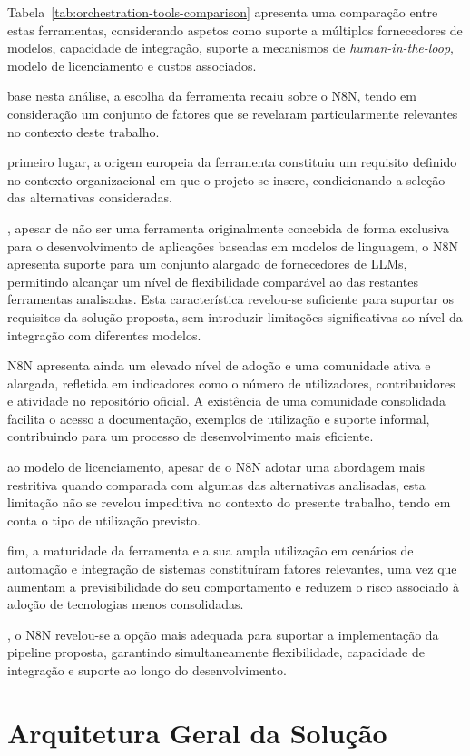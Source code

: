  Tabela~\ref{tab:orchestration-tools-comparison} apresenta uma comparação entre estas ferramentas, considerando aspetos como suporte a múltiplos fornecedores de modelos, capacidade de integração, suporte a mecanismos de \textit{human-in-the-loop}, modelo de licenciamento e custos associados.

 base nesta análise, a escolha da ferramenta recaiu sobre o N8N, tendo em consideração um conjunto de fatores que se revelaram particularmente relevantes no contexto deste trabalho.

 primeiro lugar, a origem europeia da ferramenta constituiu um requisito definido no contexto organizacional em que o projeto se insere, condicionando a seleção das alternativas consideradas.

, apesar de não ser uma ferramenta originalmente concebida de forma exclusiva para o desenvolvimento de aplicações baseadas em modelos de linguagem, o N8N apresenta suporte para um conjunto alargado de fornecedores de LLMs, permitindo alcançar um nível de flexibilidade comparável ao das restantes ferramentas analisadas. Esta característica revelou-se suficiente para suportar os requisitos da solução proposta, sem introduzir limitações significativas ao nível da integração com diferentes modelos.

 N8N apresenta ainda um elevado nível de adoção e uma comunidade ativa e alargada, refletida em indicadores como o número de utilizadores, contribuidores e atividade no repositório oficial. A existência de uma comunidade consolidada facilita o acesso a documentação, exemplos de utilização e suporte informal, contribuindo para um processo de desenvolvimento mais eficiente.

 ao modelo de licenciamento, apesar de o N8N adotar uma abordagem mais restritiva quando comparada com algumas das alternativas analisadas, esta limitação não se revelou impeditiva no contexto do presente trabalho, tendo em conta o tipo de utilização previsto.

 fim, a maturidade da ferramenta e a sua ampla utilização em cenários de automação e integração de sistemas constituíram fatores relevantes, uma vez que aumentam a previsibilidade do seu comportamento e reduzem o risco associado à adoção de tecnologias menos consolidadas.

, o N8N revelou-se a opção mais adequada para suportar a implementação da pipeline proposta, garantindo simultaneamente flexibilidade, capacidade de integração e suporte ao longo do desenvolvimento.

\section{Arquitetura Geral da Solução}
